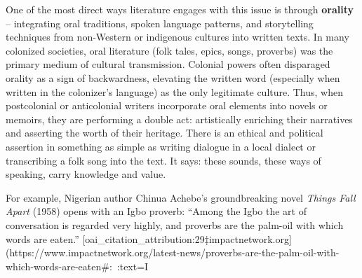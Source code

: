 \documentclass[12pt]{report}
\begin{document}
One of the most direct ways literature engages with this issue is through \textbf{orality} – integrating oral traditions, spoken language patterns, and storytelling techniques from non-Western or indigenous cultures into written texts. In many colonized societies, oral literature (folk tales, epics, songs, proverbs) was the primary medium of cultural transmission. Colonial powers often disparaged orality as a sign of backwardness, elevating the written word (especially when written in the colonizer’s language) as the only legitimate culture. Thus, when postcolonial or anticolonial writers incorporate oral elements into novels or memoirs, they are performing a double act: artistically enriching their narratives and asserting the worth of their heritage. There is an ethical and political assertion in something as simple as writing dialogue in a local dialect or transcribing a folk song into the text. It says: these sounds, these ways of speaking, carry knowledge and value. 

For example, Nigerian author Chinua Achebe’s groundbreaking novel \textit{Things Fall Apart} (1958) opens with an Igbo proverb: “Among the Igbo the art of conversation is regarded very highly, and proverbs are the palm-oil with which words are eaten.” [oai_citation_attribution:29‡impactnetwork.org](https://www.impactnetwork.org/latest-news/proverbs-are-the-palm-oil-with-which-words-are-eaten#:~:text=I%
\end{document}
